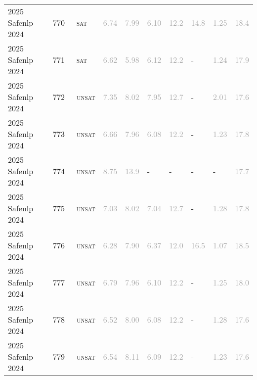 \begin{center}
{\begin{longtable}{@{}llllllllll@{}}
2025 Safenlp 2024 & 770 & ~\textsc{sat} & \textcolor{darkgray}{6.74} & \textcolor{darkgray}{7.99} & \textcolor{darkgray}{6.10} & \textcolor{darkgray}{12.2} & \textcolor{darkgray}{14.8} & \textcolor{darkgray}{1.25} & \textcolor{darkgray}{18.4} \\
2025 Safenlp 2024 & 771 & ~\textsc{sat} & \textcolor{darkgray}{6.62} & \textcolor{darkgray}{5.98} & \textcolor{darkgray}{6.12} & \textcolor{darkgray}{12.2} & - & \textcolor{darkgray}{1.24} & \textcolor{darkgray}{17.9} \\
2025 Safenlp 2024 & 772 & ~\textsc{unsat} & \textcolor{darkgray}{7.35} & \textcolor{darkgray}{8.02} & \textcolor{darkgray}{7.95} & \textcolor{darkgray}{12.7} & - & \textcolor{darkgray}{2.01} & \textcolor{darkgray}{17.6} \\
2025 Safenlp 2024 & 773 & ~\textsc{unsat} & \textcolor{darkgray}{6.66} & \textcolor{darkgray}{7.96} & \textcolor{darkgray}{6.08} & \textcolor{darkgray}{12.2} & - & \textcolor{darkgray}{1.23} & \textcolor{darkgray}{17.8} \\
2025 Safenlp 2024 & 774 & ~\textsc{unsat} & \textcolor{darkgray}{8.75} & \textcolor{darkgray}{13.9} & - & - & - & - & \textcolor{darkgray}{17.7} \\
2025 Safenlp 2024 & 775 & ~\textsc{unsat} & \textcolor{darkgray}{7.03} & \textcolor{darkgray}{8.02} & \textcolor{darkgray}{7.04} & \textcolor{darkgray}{12.7} & - & \textcolor{darkgray}{1.28} & \textcolor{darkgray}{17.8} \\
2025 Safenlp 2024 & 776 & ~\textsc{unsat} & \textcolor{darkgray}{6.28} & \textcolor{darkgray}{7.90} & \textcolor{darkgray}{6.37} & \textcolor{darkgray}{12.0} & \textcolor{darkgray}{16.5} & \textcolor{darkgray}{1.07} & \textcolor{darkgray}{18.5} \\
2025 Safenlp 2024 & 777 & ~\textsc{unsat} & \textcolor{darkgray}{6.79} & \textcolor{darkgray}{7.96} & \textcolor{darkgray}{6.10} & \textcolor{darkgray}{12.2} & - & \textcolor{darkgray}{1.25} & \textcolor{darkgray}{18.0} \\
2025 Safenlp 2024 & 778 & ~\textsc{unsat} & \textcolor{darkgray}{6.52} & \textcolor{darkgray}{8.00} & \textcolor{darkgray}{6.08} & \textcolor{darkgray}{12.2} & - & \textcolor{darkgray}{1.28} & \textcolor{darkgray}{17.6} \\
2025 Safenlp 2024 & 779 & ~\textsc{unsat} & \textcolor{darkgray}{6.54} & \textcolor{darkgray}{8.11} & \textcolor{darkgray}{6.09} & \textcolor{darkgray}{12.2} & - & \textcolor{darkgray}{1.23} & \textcolor{darkgray}{17.6} \\

\end{longtable}}
\end{center}
